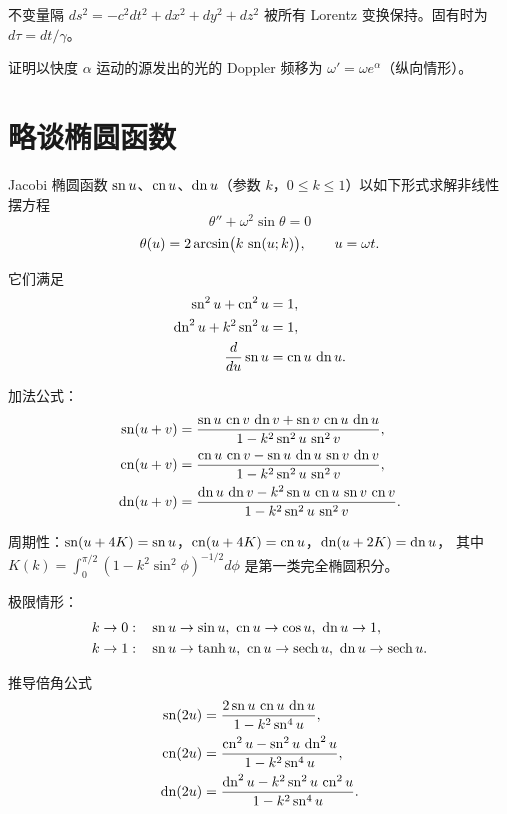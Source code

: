 不变量隔 $ds^2 = -c^2dt^2 + dx^2+dy^2+dz^2$ 被所有 Lorentz 变换保持。固有时为
$d\tau = dt/\gamma$。

\begin{exercise}
证明以快度 $\alpha$ 运动的源发出的光的 Doppler 频移为 $\omega'=\omega e^{\alpha}$（纵向情形）。
\end{exercise}

\section{略谈椭圆函数}

Jacobi 椭圆函数 $\sn u$、$\cn u$、$\dn u$（参数 $k$，$0\le k\le1$）以如下形式求解非线性摆方程
\begin{equation}
\theta'' + \omega^2\sin\theta = 0
\label{eq:5.6.1}
\end{equation}
\begin{equation}
\theta(u) = 2\arcsin\bigl(k\,\sn(u;k)\bigr), \qquad u = \omega t.
\label{eq:5.6.2}
\end{equation}

它们满足
\begin{align}
\sn^2 u + \cn^2 u &= 1,\\
\dn^2 u + k^2\sn^2 u &= 1,\\
\frac{d}{du}\sn u &= \cn u\,\dn u.
\label{eq:5.6.3}
\end{align}

加法公式：
\begin{align}
\sn(u+v) &= \frac{\sn u\,\cn v\,\dn v + \sn v\,\cn u\,\dn u}
                  {1-k^2\sn^2 u\,\sn^2 v},\\
\cn(u+v) &= \frac{\cn u\,\cn v - \sn u\,\dn u\,\sn v\,\dn v}
                {1-k^2\sn^2 u\,\sn^2 v},\\
\dn(u+v) &= \frac{\dn u\,\dn v - k^2\sn u\,\cn u\,\sn v\,\cn v}
                {1-k^2\sn^2 u\,\sn^2 v}.
\label{eq:5.6.4}
\end{align}

周期性：$\sn(u+4K)=\sn u$，$\cn(u+4K)=\cn u$，$\dn(u+2K)=\dn u$，
其中 $K(k)=\int_0^{\pi/2}(1-k^2\sin^2\phi)^{-1/2}d\phi$ 是第一类完全椭圆积分。

极限情形：
\begin{align}
k\to0:&\quad \sn u\to\sin u,\ \cn u\to\cos u,\ \dn u\to1,\\
k\to1:&\quad \sn u\to\tanh u,\ \cn u\to\sech u,\ \dn u\to\sech u.
\label{eq:5.6.5}
\end{align}

\begin{exercise}
推导倍角公式
\begin{align}
\sn(2u) &= \frac{2\sn u\,\cn u\,\dn u}{1-k^2\sn^4 u},\\
\cn(2u) &= \frac{\cn^2 u - \sn^2 u\,\dn^2 u}{1-k^2\sn^4 u},\\
\dn(2u) &= \frac{\dn^2 u - k^2\sn^2 u\,\cn^2 u}{1-k^2\sn^4 u}.
\end{align}
\end{exercise}

